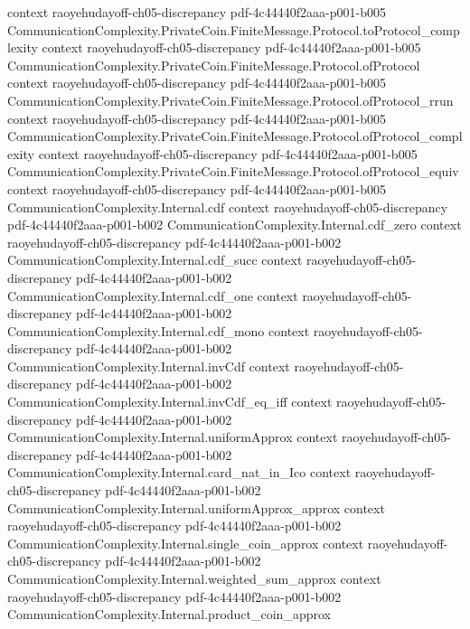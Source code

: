 \begin{lemma}
  {context}
  {raoyehudayoff-ch05-discrepancy}
  {pdf-4c44440f2aaa-p001-b005}
\proofstep
  {CommunicationComplexity.PrivateCoin.FiniteMessage.Protocol.toProtocol_complexity}
  {context}
  {raoyehudayoff-ch05-discrepancy}
  {pdf-4c44440f2aaa-p001-b005}
\proofstep
  {CommunicationComplexity.PrivateCoin.FiniteMessage.Protocol.ofProtocol}
  {context}
  {raoyehudayoff-ch05-discrepancy}
  {pdf-4c44440f2aaa-p001-b005}
\proofstep
  {CommunicationComplexity.PrivateCoin.FiniteMessage.Protocol.ofProtocol_rrun}
  {context}
  {raoyehudayoff-ch05-discrepancy}
  {pdf-4c44440f2aaa-p001-b005}
\proofstep
  {CommunicationComplexity.PrivateCoin.FiniteMessage.Protocol.ofProtocol_complexity}
  {context}
  {raoyehudayoff-ch05-discrepancy}
  {pdf-4c44440f2aaa-p001-b005}
\proofstep
  {CommunicationComplexity.PrivateCoin.FiniteMessage.Protocol.ofProtocol_equiv}
  {context}
  {raoyehudayoff-ch05-discrepancy}
  {pdf-4c44440f2aaa-p001-b005}
\proofstep
  {CommunicationComplexity.Internal.cdf}
  {context}
  {raoyehudayoff-ch05-discrepancy}
  {pdf-4c44440f2aaa-p001-b002}
\proofstep
  {CommunicationComplexity.Internal.cdf_zero}
  {context}
  {raoyehudayoff-ch05-discrepancy}
  {pdf-4c44440f2aaa-p001-b002}
\proofstep
  {CommunicationComplexity.Internal.cdf_succ}
  {context}
  {raoyehudayoff-ch05-discrepancy}
  {pdf-4c44440f2aaa-p001-b002}
\proofstep
  {CommunicationComplexity.Internal.cdf_one}
  {context}
  {raoyehudayoff-ch05-discrepancy}
  {pdf-4c44440f2aaa-p001-b002}
\proofstep
  {CommunicationComplexity.Internal.cdf_mono}
  {context}
  {raoyehudayoff-ch05-discrepancy}
  {pdf-4c44440f2aaa-p001-b002}
\proofstep
  {CommunicationComplexity.Internal.invCdf}
  {context}
  {raoyehudayoff-ch05-discrepancy}
  {pdf-4c44440f2aaa-p001-b002}
\proofstep
  {CommunicationComplexity.Internal.invCdf_eq_iff}
  {context}
  {raoyehudayoff-ch05-discrepancy}
  {pdf-4c44440f2aaa-p001-b002}
\proofstep
  {CommunicationComplexity.Internal.uniformApprox}
  {context}
  {raoyehudayoff-ch05-discrepancy}
  {pdf-4c44440f2aaa-p001-b002}
\proofstep
  {CommunicationComplexity.Internal.card_nat_in_Ico}
  {context}
  {raoyehudayoff-ch05-discrepancy}
  {pdf-4c44440f2aaa-p001-b002}
\proofstep
  {CommunicationComplexity.Internal.uniformApprox_approx}
  {context}
  {raoyehudayoff-ch05-discrepancy}
  {pdf-4c44440f2aaa-p001-b002}
\proofstep
  {CommunicationComplexity.Internal.single_coin_approx}
  {context}
  {raoyehudayoff-ch05-discrepancy}
  {pdf-4c44440f2aaa-p001-b002}
\proofstep
  {CommunicationComplexity.Internal.weighted_sum_approx}
  {context}
  {raoyehudayoff-ch05-discrepancy}
  {pdf-4c44440f2aaa-p001-b002}
\proofstep
  {CommunicationComplexity.Internal.product_coin_approx}

\end{lemma}
